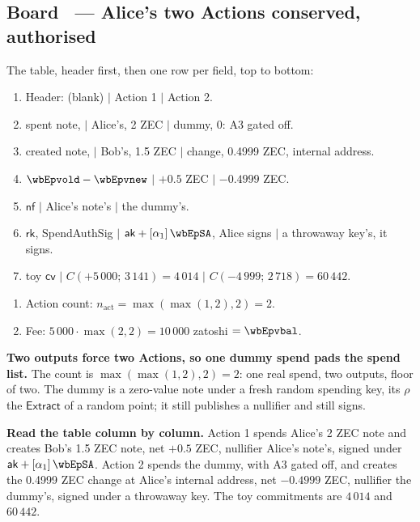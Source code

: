 \documentclass[11pt,a4paper]{article}
\makeatletter
\newcommand{\nfsym}{\ensuremath{\mathsf{nf}}}
\newcommand{\cvsym}{\ensuremath{\mathsf{cv}}}
\newcommand{\rksym}{\ensuremath{\mathsf{rk}}}
\newcommand{\aksym}{\ensuremath{\mathsf{ak}}}
\newcommand{\Extract}{\ensuremath{\mathsf{Extract}}}
\newcounter{board}
\newenvironment{board}[2]{\stepcounter{board}%
  \subsection*{Board \theboard\ --- #1 \hfill {\normalfont\small\color{arb}#2}}}{\medskip}
\newcommand{\Draw}{\draw@head{Draw}}
\newcommand{\Write}{\draw@head{Write}}
\newcommand{\Say}{\draw@head{Say}}
\makeatother
\begin{document}
\begin{board}{Alice's two Actions}{conserved, authorised}
\Draw
The table, header first, then one row per field, top to bottom:
\begin{enumerate}
\item Header: (blank) $\mid$ Action 1 $\mid$ Action 2.
\item spent note, \wbEpvold{} $\mid$ Alice's, 2 ZEC $\mid$ dummy, $0$:
  A3 gated off.
\item created note, \wbEpvnew{} $\mid$ Bob's, 1.5 ZEC $\mid$ change,
  0.4999 ZEC, internal address.
\item $\wbEpvold - \wbEpvnew$ $\mid$ $+0.5$ ZEC $\mid$ $-0.4999$ ZEC.
\item \nfsym{} $\mid$ Alice's note's $\mid$ the dummy's.
\item \rksym, SpendAuthSig $\mid$ $\aksym + [\alpha_1]\,\wbEpSA$, Alice
  signs $\mid$ a throwaway key's, it signs.
\item toy \cvsym{} $\mid$ $C(+5\,000;\, 3\,141) = 4\,014$ $\mid$
  $C(-4\,999;\, 2\,718) = 60\,442$.
\end{enumerate}
\Write
\begin{enumerate}
\item Action count: $n_{\mathrm{act}} = \max(\max(1, 2), 2) = 2$.
\item Fee: $5\,000 \cdot \max(2, 2) = 10\,000$ zatoshi $= \wbEpvbal$.
\end{enumerate}
\Say
\textbf{Two outputs force two Actions, so one dummy spend pads the
spend list.} The count is $\max(\max(1, 2), 2) = 2$: one real spend,
two outputs, floor of two. The dummy is a zero-value note under a fresh
random spending key, its $\rho$ the \Extract{} of a random point; it
still publishes a nullifier and still signs.

\textbf{Read the table column by column.} Action 1 spends Alice's 2 ZEC
note and creates Bob's 1.5 ZEC note, net $+0.5$ ZEC, nullifier Alice's
note's, signed under $\aksym + [\alpha_1]\,\wbEpSA$. Action 2 spends
the dummy, with A3 gated off, and creates the 0.4999 ZEC change at
Alice's internal address, net $-0.4999$ ZEC, nullifier the dummy's,
signed under a throwaway key. The toy commitments are $4\,014$ and
$60\,442$.


\end{board}
\end{document}
